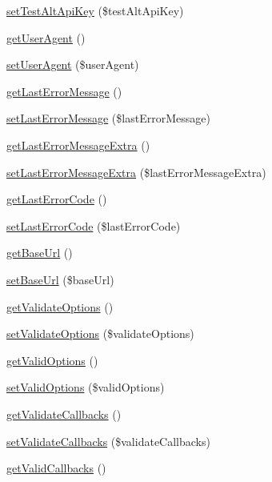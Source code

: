 \begin{DoxyCompactItemize}
\item 
\hyperlink{classCXLApiComponent_a5dc9200ce16ea1d68df29cc6023c7481}{setTestAltApiKey} (\$testAltApiKey)
\item 
\hyperlink{classCXLApiComponent_a48e8658a82c25e220a9524c1f1a42d5d}{getUserAgent} ()
\item 
\hyperlink{classCXLApiComponent_ac3abfe8b343b4a2f8cd3ff90d9df92f7}{setUserAgent} (\$userAgent)
\item 
\hyperlink{classCXLApiComponent_a618ddc8b1edcb086ac15d5eee6cc4bd8}{getLastErrorMessage} ()
\item 
\hyperlink{classCXLApiComponent_a4b7bfa4ad702defa357b91872fd46bb2}{setLastErrorMessage} (\$lastErrorMessage)
\item 
\hyperlink{classCXLApiComponent_a1e5c3953744539e1a72dbacf736ba070}{getLastErrorMessageExtra} ()
\item 
\hyperlink{classCXLApiComponent_aa62061474c16981360340ba8cfdac640}{setLastErrorMessageExtra} (\$lastErrorMessageExtra)
\item 
\hyperlink{classCXLApiComponent_aeb3d06b62e5222903e9324435c198ca3}{getLastErrorCode} ()
\item 
\hyperlink{classCXLApiComponent_aa770aa5608fb4f4c43a1b2785cd48208}{setLastErrorCode} (\$lastErrorCode)
\item 
\hyperlink{classCXLApiComponent_ae1ca0d2444e3cca6b147445348f686de}{getBaseUrl} ()
\item 
\hyperlink{classCXLApiComponent_a6acd31b61e7897fdf8983d355f4f7c07}{setBaseUrl} (\$baseUrl)
\item 
\hyperlink{classCXLApiComponent_a0213d6968c9e90b0c9d00074f45185a0}{getValidateOptions} ()
\item 
\hyperlink{classCXLApiComponent_abe9696fbc0a4b90eda4bb16d3c2cfddc}{setValidateOptions} (\$validateOptions)
\item 
\hyperlink{classCXLApiComponent_a4c78203139d38f02a2bc24a44ee488b2}{getValidOptions} ()
\item 
\hyperlink{classCXLApiComponent_a667a9bae9525352a2f5e784d59043a4c}{setValidOptions} (\$validOptions)
\item 
\hyperlink{classCXLApiComponent_ad95c12afcd8d0e4643517c58fd1d5db5}{getValidateCallbacks} ()
\item 
\hyperlink{classCXLApiComponent_a0df91a7a97e85d6a7aa0635de857073d}{setValidateCallbacks} (\$validateCallbacks)
\item 
\hyperlink{classCXLApiComponent_a0ae83f73b03acd21c05befda99b42584}{getValidCallbacks} ()
\item 

\end{DoxyCompactItemize}

